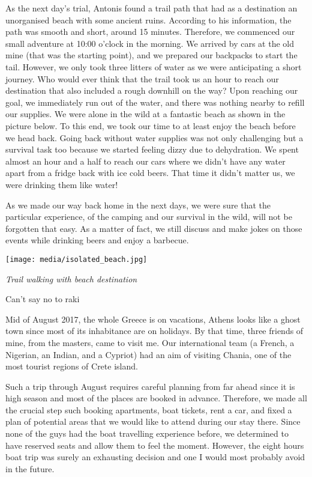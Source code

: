 \documentclass[10pt,a4paper]{article} %
\newcommand{\NewsItem}[1]{ %
\usefont{T1}{fvs}{n}{n} %
\vspace{24pt}\large #1\vspace{3pt} %
\par \normalsize \normalfont}
\begin{document}
\begin{multicols}{3}
As the next day's trial, Antonis found a trail path that had as a destination
an unorganised beach with some ancient ruins. 
According to his information, the path was smooth and short, around 15 minutes. 
Therefore, we commenced our small adventure at 10:00 o'clock in the morning. 
We arrived by cars at the old mine (that was the starting point),
and we prepared our backpacks to start the tail. 
However, we only took three litters of water as we were anticipating a short journey. 
Who would ever think that the trail took us an hour to reach our destination
that also included a rough downhill on the way?
Upon reaching our goal, we immediately run out of the water,
and there was nothing nearby to refill our supplies. 
We were alone in the wild at a fantastic beach as shown in the picture below. 
To this end, we took our time to at least enjoy the beach before we head back. 
Going back without water supplies was not only challenging but a survival task too
because we started feeling dizzy due to dehydration.   
We spent almost an hour and a half to reach our cars where
we didn't have any water apart from a fridge back with ice cold beers. 
That time it didn't matter us, we were drinking them like water! 

As we made our way back home in the next days,
we were sure that the particular experience,
of the camping and our survival in the wild, will not be forgotten that easy. 
As a matter of fact, we still discuss and make jokes on those events while 
drinking beers and enjoy a barbecue.

\begin{center}
	\texttt{[image: media/isolated\_beach.jpg]}
	\par\textit{Trail walking with beach destination}
\end{center}

\NewsItem{Can't say no to raki}
Mid of August 2017, the whole Greece is on vacations,
Athens looks like a ghost town since most of its inhabitance are on holidays. 
By that time, three friends of mine, from the masters, came to visit me. 
Our international team (a French, a Nigerian, an Indian, and a Cypriot)
had an aim of visiting Chania, one of the most tourist regions of Crete island.   

Such a trip through August requires careful planning from far ahead
since it is high season and most of the places are booked in advance. 
Therefore, we made all the crucial step such booking apartments,
boat tickets, rent a car, and fixed a plan of potential areas that
we would like to attend during our stay there. 
Since none of the guys had the boat travelling experience before,
we determined to have reserved seats and allow them to feel the moment. 
However, the eight hours boat trip was surely an exhausting decision
and one I would most probably avoid in the future.



\end{multicols}
\end{document}
